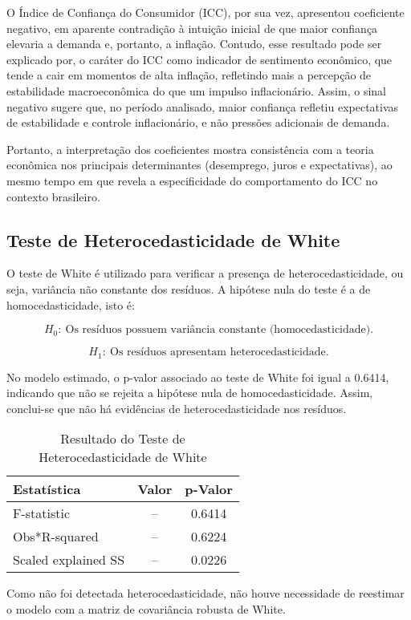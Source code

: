 \documentclass[12pt,oneside]{abntex2}
\begin{document}
O Índice de Confiança do Consumidor (ICC), por sua vez, apresentou coeficiente negativo, em aparente contradição à intuição inicial de que maior confiança elevaria a demanda e, portanto, a inflação. Contudo, esse resultado pode ser explicado por, o caráter do ICC como indicador de sentimento econômico, que tende a cair em momentos de alta inflação, refletindo mais a percepção de estabilidade macroeconômica do que um impulso inflacionário. Assim, o sinal negativo sugere que, no período analisado, maior confiança refletiu expectativas de estabilidade e controle inflacionário, e não pressões adicionais de demanda.

Portanto, a interpretação dos coeficientes mostra consistência com a teoria econômica nos principais determinantes (desemprego, juros e expectativas), ao mesmo tempo em que revela a especificidade do comportamento do ICC no contexto brasileiro.

\subsection{\textbf{Teste de Heterocedasticidade de White}}

O teste de White é utilizado para verificar a presença de heterocedasticidade, ou seja, variância não constante dos resíduos. A hipótese nula do teste é a de homocedasticidade, isto é:

\[
H_0: \ \text{Os resíduos possuem variância constante (homocedasticidade).}
\]

\[
H_1: \ \text{Os resíduos apresentam heterocedasticidade.}
\]

No modelo estimado, o p-valor associado ao teste de White foi igual a 0.6414, indicando que não se rejeita a hipótese nula de homocedasticidade. Assim, conclui-se que não há evidências de heterocedasticidade nos resíduos. 

\begin{table}[H]
\centering
\caption{Resultado do Teste de Heterocedasticidade de White}
\begin{tabular}{lcc}
\hline
Estatística & Valor & p-Valor \\
\hline
F-statistic & -- & 0.6414 \\
Obs*R-squared & -- & 0.6224 \\
Scaled explained SS & -- & 0.0226 \\
\hline
\end{tabular}
\end{table}

Como não foi detectada heterocedasticidade, não houve necessidade de reestimar o modelo com a matriz de covariância robusta de White. 
\end{document}
